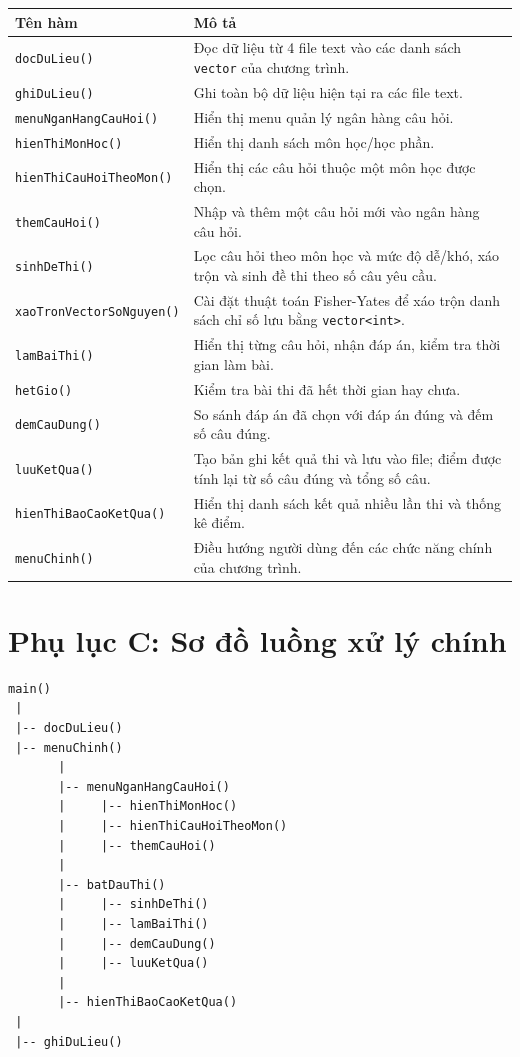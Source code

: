\documentclass[12pt,a4paper]{article}
\begin{document}
\begin{longtable}{|p{5cm}|p{9cm}|}
\hline
\textbf{Tên hàm} & \textbf{Mô tả} \\
\hline
\texttt{docDuLieu()} & Đọc dữ liệu từ 4 file text vào các danh sách \texttt{vector} của chương trình. \\
\hline
\texttt{ghiDuLieu()} & Ghi toàn bộ dữ liệu hiện tại ra các file text. \\
\hline
\texttt{menuNganHangCauHoi()} & Hiển thị menu quản lý ngân hàng câu hỏi. \\
\hline
\texttt{hienThiMonHoc()} & Hiển thị danh sách môn học/học phần. \\
\hline
\texttt{hienThiCauHoiTheoMon()} & Hiển thị các câu hỏi thuộc một môn học được chọn. \\
\hline
\texttt{themCauHoi()} & Nhập và thêm một câu hỏi mới vào ngân hàng câu hỏi. \\
\hline
\texttt{sinhDeThi()} & Lọc câu hỏi theo môn học và mức độ dễ/khó, xáo trộn và sinh đề thi theo số câu yêu cầu. \\
\hline
\texttt{xaoTronVectorSoNguyen()} & Cài đặt thuật toán Fisher-Yates để xáo trộn danh sách chỉ số lưu bằng \texttt{vector<int>}. \\
\hline
\texttt{lamBaiThi()} & Hiển thị từng câu hỏi, nhận đáp án, kiểm tra thời gian làm bài. \\
\hline
\texttt{hetGio()} & Kiểm tra bài thi đã hết thời gian hay chưa. \\
\hline
\texttt{demCauDung()} & So sánh đáp án đã chọn với đáp án đúng và đếm số câu đúng. \\
\hline
\texttt{luuKetQua()} & Tạo bản ghi kết quả thi và lưu vào file; điểm được tính lại từ số câu đúng và tổng số câu. \\
\hline
\texttt{hienThiBaoCaoKetQua()} & Hiển thị danh sách kết quả nhiều lần thi và thống kê điểm. \\
\hline
\texttt{menuChinh()} & Điều hướng người dùng đến các chức năng chính của chương trình. \\
\hline
\end{longtable}

\section{Phụ lục C: Sơ đồ luồng xử lý chính}

\begin{center}
\begin{minipage}{0.95\textwidth}
\begin{verbatim}
main()
 |
 |-- docDuLieu()
 |-- menuChinh()
       |
       |-- menuNganHangCauHoi()
       |     |-- hienThiMonHoc()
       |     |-- hienThiCauHoiTheoMon()
       |     |-- themCauHoi()
       |
       |-- batDauThi()
       |     |-- sinhDeThi()
       |     |-- lamBaiThi()
       |     |-- demCauDung()
       |     |-- luuKetQua()
       |
       |-- hienThiBaoCaoKetQua()
 |
 |-- ghiDuLieu()
\end{verbatim}
\end{minipage}
\end{center}
\end{document}

